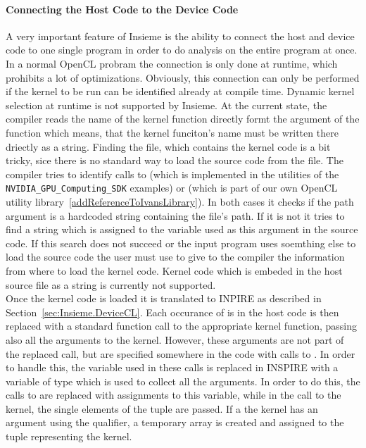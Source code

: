 \paragraph{Connecting the Host Code to the Device Code}

A very important feature of Insieme is the ability to connect the host and device code to one single program in order to do analysis on the entire program at once. In a normal OpenCL probram the connection is only done at runtime, which prohibits a lot of optimizations. Obviously, this connection can only be performed if the kernel to be run can be identified already at compile time. Dynamic kernel selection at runtime is not supported by Insieme. At the current state, the compiler reads the name of the kernel function directly formt the  argument of the function  which means, that the kernel funciton's name must be written there driectly as a string. Finding the file, which contains the kernel code is a bit tricky, sice there is no standard way to load the source code from the file. The compiler tries to identify calls to  (which is implemented in the utilities of the \texttt{NVIDIA\_GPU\_Computing\_SDK} examples) or  (which is part of our own OpenCL utility library~\ref{addReferenceToIvansLibrary}). In both cases it checks if the path argument is a hardcoded string containing the file's path. If it is not it tries to find a string which is assigned to the variable used as this argument in the source code. If this search does not succeed or the input program uses soemthing else to load the source code the user must use  to give to the compiler the information from where to load the kernel code. Kernel code which is embeded in the host source file as a string is currently not supported. \\
Once the kernel code is loaded it is translated to INPIRE as described in Section~\ref{sec:Insieme.DeviceCL}. Each occurance of  is in the host code is then replaced with a standard function call to the appropriate kernel function, passing also all the arguments to the kernel. However, these arguments are not part of the replaced call, but are specified somewhere in the code with calls to . In order to handle this, the  variable used in these calls is replaced in INSPIRE with a variable of type  which is used to collect all the arguments. In order to do this, the calls to  are replaced with assignments to this variable, while in the call to the kernel, the single elements of the tuple are passed. If a the kernel has an argument using the  qualifier, a temporary array is created and assigned to the tuple representing the kernel. \\

